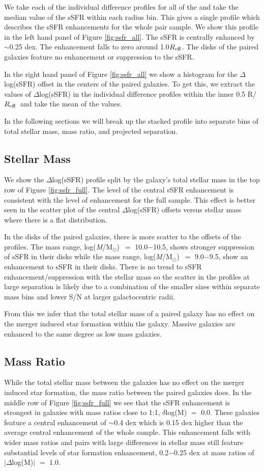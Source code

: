 \documentclass[iop,revtex4,twocolumn,apj,numberedappendix,appendixfloats]{emulateapj}
\newcommand{\reff}{$R_{\rm eff}$}
\newcommand{\logm}{log({\it M}/M$_{\odot}$)}
\begin{document}
We take each of the individual difference profiles for all of the and take the median value of the sSFR within each radius bin. This gives a single profile which describes the sSFR enhancements for the whole pair sample. We show this profile in the left hand panel of Figure \ref{fig:ssfr_all}. The sSFR is centrally enhanced by $\sim$0.25 dex. The enhancement falls to zero around 1.0\reff. The disks of the paired galaxies feature no enhancement or suppression to the sSFR. 

In the right hand panel of Figure \ref{fig:ssfr_all} we show a histogram for the $\Delta$log(sSFR) offset in the centers of the paired galaxies. To get this, we extract the values of $\Delta$log(sSFR) in the individual difference profiles within the inner 0.5 R/\reff\ and take the mean of the values. 

In the following sections we will break up the stacked profile into separate bins of total stellar mass, mass ratio, and projected separation. 

\subsection{Stellar Mass}
We show the $\Delta$log(sSFR) profile split by the galaxy's total stellar mass in the top row of Figure \ref{fig:ssfr_full}. The level of the central sSFR enhancement is consistent with the level of enhancement for the full sample. This effect is better seen in the scatter plot of the central $\Delta$log(sSFR) offsets versus stellar mass where there is a flat distribution. 

In the disks of the paired galaxies, there is more scatter to the offsets of the profiles. The mass range, \logm\ $=$ 10.0$-$10.5, shows stronger suppression of sSFR in their disks while the mass range, \logm\ $=$ 9.0$-$9.5, show an enhancement to sSFR in their disks. There is no trend to sSFR enhancement/suppression with the stellar mass so the scatter in the profiles at large separation is likely due to a combination of the smaller sizes within separate mass bins and lower S/N at larger galactocentric radii.

From this we infer that the total stellar mass of a paired galaxy has no effect on the merger induced star formation within the galaxy. Massive galaxies are enhanced to the same degree as low mass galaxies. 

\subsection{Mass Ratio}
While the total stellar mass between the galaxies has no effect on the merger induced star formation, the mass ratio between the paired galaxies does. In the middle row of Figure \ref{fig:ssfr_full} we see that the sSFR enhancement is strongest in galaxies with mass ratios close to 1:1, $\delta$log(M) $=$ 0.0. These galaxies feature a central enhancement of $\sim$0.4 dex which is 0.15 dex higher than the average central enhancement of the whole sample. This enhancement falls with wider mass ratios and pairs with large differences in stellar mass still feature substantial levels of star formation enhancement, 0.2$-$0.25 dex at mass ratios of $|\Delta$log(M)$|$ $=$ 1.0.
\end{document}
